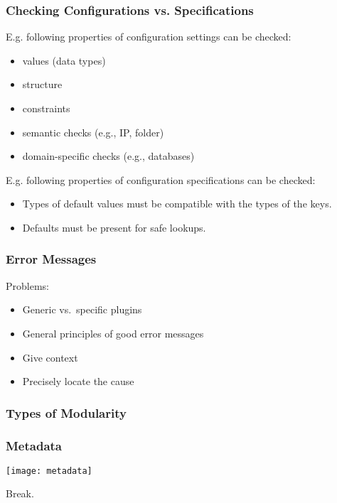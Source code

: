 \begin{frame}
	\frametitle{Checking Configurations vs. Specifications}

	\pause

	E.g. following properties of configuration settings can be checked:

	\begin{itemize}
	\item values (data types)
	\item structure
	\item constraints
	\item semantic checks (e.g., IP, folder)
	\item domain-specific checks (e.g., databases)
	\end{itemize}

	\vspace{1em}
	E.g. following properties of configuration specifications can be checked:

	\begin{itemize}
	\item Types of default values must be compatible with the types of the keys.
	\item Defaults must be present for safe lookups.
	\end{itemize}
\end{frame}

\begin{frame}[fragile]
	\frametitle{Error Messages}

	Problems:
	\begin{itemize} %
	\item Generic vs.\ specific plugins
	\item General principles of good error messages~\cite{lee2011personifying}
	\item Give context
	\item Precisely locate the cause
	\end{itemize}
\end{frame}

\begin{frame}
	\frametitle{Types of Modularity}
	\Large
\end{frame}

\begin{frame}
	\frametitle{Metadata}

	\texttt{[image: metadata]}
\end{frame}

\begin{assignment}
	\begin{task}
	Break.
	\end{task}
\end{assignment}


